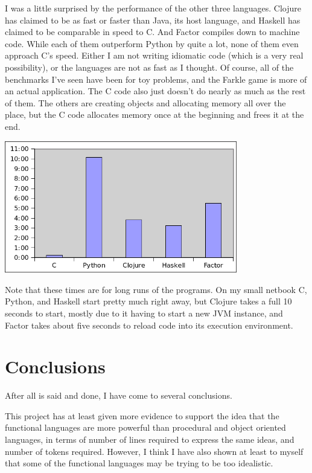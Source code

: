 \documentclass{article}
\begin{document}
I was a little surprised by the performance of the other three languages.
Clojure has claimed to be as fast or faster than Java, its host language, and
Haskell has claimed to be comparable in speed to C.  And Factor compiles down to
machine code.  While each of them outperform Python by quite a lot, none of them
even approach C's speed.  Either I am not writing idiomatic code (which is a
very real possibility), or the languages are not as fast as I thought.  Of
course, all of the benchmarks I've seen have been for toy problems, and the
Farkle game is more of an actual application.  The C code also just doesn't do
nearly as much as the rest of them.  The others are creating objects and
allocating memory all over the place, but the C code allocates memory once at
the beginning and frees it at the end.

\includegraphics[width=4in]{graphs/performance-comparison.png}

Note that these times are for long runs of the programs.  On my small netbook C,
Python, and Haskell start pretty much right away, but Clojure takes a full 10
seconds to start, mostly due to it having to start a new JVM instance, and
Factor takes about five seconds to reload code into its execution environment.

\section{Conclusions}

After all is said and done, I have come to several conclusions.

This project has at least given more evidence to support the idea that the
functional languages are more powerful than procedural and object oriented
languages, in terms of number of lines required to express the same ideas, and
number of tokens required.  However, I think I have also shown at least to
myself that some of the functional languages may be trying to be too idealistic.  
\end{document}
